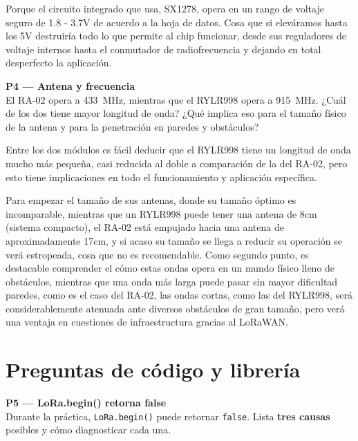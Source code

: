 \documentclass[11pt, letterpaper]{article}
\newenvironment{pregunta}[1]{%
  \begin{mdframed}[backgroundcolor=purpleLight, linecolor=purpleMain, linewidth=1pt,
    innerleftmargin=12pt, innerrightmargin=12pt,
    innertopmargin=8pt,  innerbottommargin=8pt]
  \textbf{\color{purpleMain}#1}\\[6pt]
}{\end{mdframed}\vspace{0.2cm}}
\begin{document}
Porque el circuito integrado que usa, SX1278, opera en un rango de voltaje seguro de 1.8 - 3.7V de acuerdo a la hoja de datos. Cosa que si elev\'aramos hasta los 5V destruir\'ia todo lo que permite al chip funcionar, desde sus reguladores de voltaje internos hasta el conmutador de radiofrecuencia y dejando en total desperfecto la aplicaci\'on.

\vspace{1cm}

\begin{pregunta}{P4 --- Antena y frecuencia}
  El RA-02 opera a 433~MHz, mientras que el RYLR998 opera a 915~MHz.
  ¿Cu\'al de los dos tiene mayor longitud de onda? ¿Qu\'e implica eso
  para el tama\~no f\'isico de la antena y para la penetraci\'on en
  paredes y obst\'aculos?
\end{pregunta}

Entre los dos m\'odulos es f\'acil deducir que el RYLR998 tiene un longitud de onda mucho m\'as pequeña, casi reducida al doble a comparaci\'on de la del RA-02, pero esto tiene implicaciones en todo el funcionamiento y aplicaci\'on espec\'ifica. 

Para empezar el tamaño de sus antenas, donde su tamaño \'optimo es incomparable, mientras que un RYLR998 puede tener una antena de 8cm (sistema compacto), el RA-02 est\'a empujado hacia una antena de aproximadamente 17cm, y si acaso su tamaño se llega a reducir su operaci\'on se ver\'a estropeada, cosa que no es recomendable. Como segundo punto, es destacable comprender el c\'omo estas ondas opera en un mundo f\'isico lleno de obst\'aculos, mientras que una onda m\'as larga puede pasar sin mayor dificultad paredes, como es el caso del RA-02, las ondas cortas, como las del RYLR998, ser\'a considerablemente atenuada ante diversos obst\'aculos de gran tamaño, pero ver\'a una ventaja en cuestiones de infraestructura gracias al LoRaWAN.

\vspace{1cm}

\newpage

\section{Preguntas de código y librería}

\begin{pregunta}{P5 --- LoRa.begin() retorna false}
  Durante la pr\'actica, \texttt{LoRa.begin()} puede retornar \texttt{false}.
  Lista \textbf{tres causas} posibles y c\'omo diagnosticar cada una.
\end{pregunta}
\end{document}
